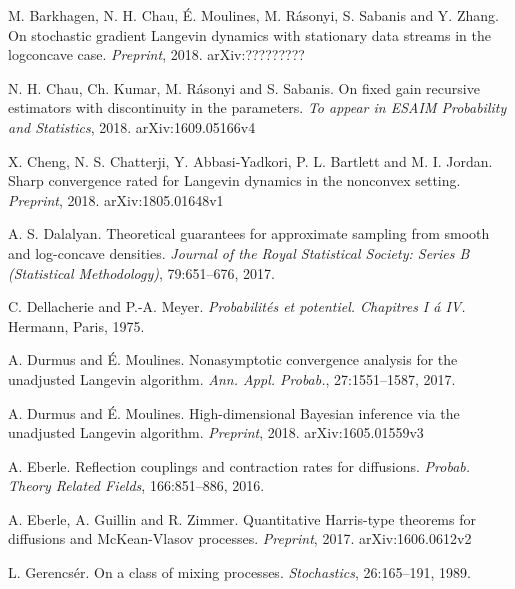 \documentclass[a4paper,draft]{article}
\begin{document}
\begin{thebibliography}{00}


 M. Barkhagen, N. H. Chau, \'E. Moulines, M. R\'asonyi,
S. Sabanis and Y. Zhang.
\newblock On stochastic gradient Langevin dynamics with stationary data
streams in the logconcave case.
\newblock \emph{Preprint}, 2018. arXiv:?????????

 N. H. Chau, Ch. Kumar, M. R\'asonyi and S. Sabanis.
\newblock On fixed gain recursive estimators with discontinuity in the parameters.
\newblock \emph{To appear in ESAIM Probability and Statistics}, 2018. arXiv:1609.05166v4

 X. Cheng, N. S. Chatterji, Y. Abbasi-Yadkori,
P. L. Bartlett and M. I. Jordan.
\newblock Sharp convergence rated for Langevin dynamics in the
nonconvex setting.
\newblock \emph{Preprint}, 2018. arXiv:1805.01648v1

 A. S. Dalalyan.
\newblock Theoretical guarantees for approximate sampling from
smooth and log-concave densities.
\newblock \emph{Journal of the Royal Statistical Society:
Series B (Statistical Methodology)}, 79:651--676, 2017.

 C. Dellacherie and P.-A. Meyer.
\newblock \emph{Probabilit\'es et potentiel. Chapitres I \'a IV.}
\newblock Hermann, Paris, 1975.

 A. Durmus and \'E. Moulines.
\newblock Nonasymptotic convergence analysis for the unadjusted Langevin algorithm.
\newblock \emph{Ann. Appl. Probab.}, 27:1551--1587, 2017.

 A. Durmus and \'E. Moulines.
\newblock High-dimensional Bayesian inference via the unadjusted Langevin algorithm.
\newblock \emph{Preprint}, 2018. arXiv:1605.01559v3

A. Eberle.
\newblock Reflection couplings and contraction rates for diffusions.
\newblock \emph{Probab. Theory Related Fields}, 166:851--886, 2016.

 A. Eberle, A. Guillin and R. Zimmer.
\newblock Quantitative Harris-type theorems for diffusions and
McKean-Vlasov processes. \newblock\emph{Preprint}, 2017.
\newblock arXiv:1606.0612v2

 L. Gerencs\'er.
\newblock On a class of mixing processes.
\newblock \emph{Stochastics},  26:165--191, 1989.


\end{thebibliography}
\end{document}
